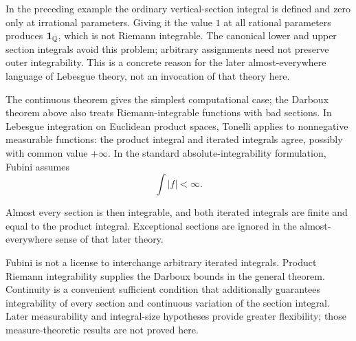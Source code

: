 \begin{remark}
In the preceding example the ordinary vertical-section integral is defined
and zero only at irrational parameters. Giving it the value $1$ at all
rational parameters produces $\mathbf1_{\mathbb{Q}}$, which is not Riemann
integrable. The canonical lower and upper section integrals avoid this
problem; arbitrary assignments need not preserve outer integrability.
This is a concrete reason for the later almost-everywhere language of
Lebesgue theory, not an invocation of that theory here.
\end{remark}

\begin{remark}
The continuous theorem gives the simplest computational case; the
Darboux theorem above also treats Riemann-integrable functions with bad sections. In Lebesgue integration on Euclidean product spaces, Tonelli applies to
nonnegative measurable functions: the product integral and iterated
integrals agree, possibly with common value $+\infty$. In the standard
absolute-integrability formulation, Fubini assumes
\[
\int|f|<\infty.
\]

Almost every section is then integrable, and both iterated integrals are
finite and equal to the product integral. Exceptional sections are ignored
in the almost-everywhere sense of that later theory.

Fubini is not a license to interchange arbitrary iterated integrals.
Product Riemann integrability supplies the Darboux bounds in the general
theorem. Continuity is a convenient sufficient condition that additionally
guarantees integrability of every section and continuous variation of the
section integral. Later measurability and integral-size hypotheses provide
greater flexibility; those measure-theoretic results are not proved here.
\end{remark}

